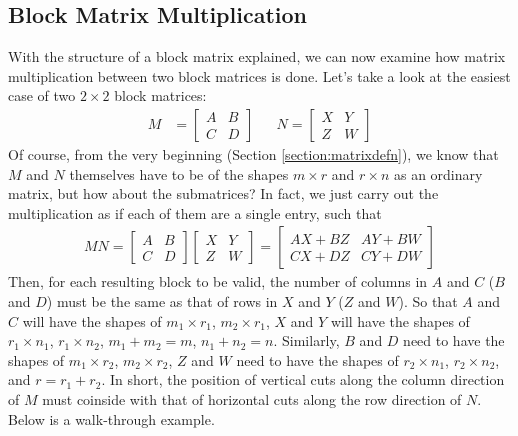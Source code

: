 \subsection{Block Matrix Multiplication}
\label{subsection:blockmul}

With the structure of a block matrix explained, we can now examine how matrix multiplication between two block matrices is done. Let's take a look at the easiest case of two $2 \times 2$ block matrices:
\begin{align*}
M &=
\begin{bmatrix}
A & B \\
C & D
\end{bmatrix} 
& &
N =
\begin{bmatrix}
X & Y \\
Z & W
\end{bmatrix} 
\end{align*}
Of course, from the very beginning (Section \ref{section:matrixdefn}), we know that $M$ and $N$ themselves have to be of the shapes $m \times r$ and $r \times n$ as an ordinary matrix, but how about the submatrices? In fact, we just carry out the multiplication as if each of them are a single entry, such that
\begin{align*}
MN = 
\begin{bmatrix}
A & B \\
C & D
\end{bmatrix} 
\begin{bmatrix}
X & Y \\
Z & W
\end{bmatrix} 
=
\begin{bmatrix}
AX + BZ & AY + BW \\
CX + DZ & CY + DW
\end{bmatrix}
\end{align*}
Then, for each resulting block to be valid, the number of columns in $A$ and $C$ ($B$ and $D$) must be the same as that of rows in $X$ and $Y$ ($Z$ and $W$). So that $A$ and $C$ will have the shapes of $m_1 \times r_1$, $m_2 \times r_1$, $X$ and $Y$ will have the shapes of $r_1 \times n_1$, $r_1 \times n_2$, $m_1 + m_2 = m$, $n_1 + n_2 = n$. Similarly, $B$ and $D$ need to have the shapes of $m_1 \times r_2$, $m_2 \times r_2$, $Z$ and $W$ need to have the shapes of $r_2 \times n_1$, $r_2 \times n_2$, and $r = r_1 + r_2$. In short, the position of vertical cuts along the column direction of $M$ must coinside with that of horizontal cuts along the row direction of $N$. Below is a walk-through example.

